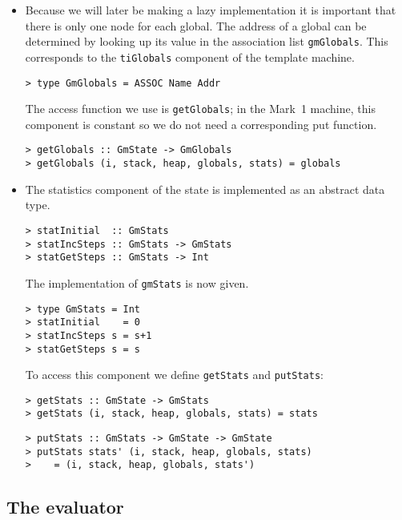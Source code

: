 \begin{itemize}
\item Because we will later be making a lazy implementation it is
important that there is only one node for each global. The address of
a global can be determined by looking up its value in the association
list \mbox{\tt gmGlobals}. This corresponds to the \mbox{\tt tiGlobals} component
of the template machine.
\begin{verbatim}
> type GmGlobals = ASSOC Name Addr
\end{verbatim}
%
The access function we use is \mbox{\tt getGlobals}; in the Mark~1 machine, this
component is constant so we do not need a corresponding put function.
\begin{verbatim}
> getGlobals :: GmState -> GmGlobals
> getGlobals (i, stack, heap, globals, stats) = globals
\end{verbatim}
%
%
\item The statistics component of the state is implemented as an
abstract data type.
\begin{verbatim}
> statInitial  :: GmStats
> statIncSteps :: GmStats -> GmStats
> statGetSteps :: GmStats -> Int
\end{verbatim}
%
%
%
The implementation of \mbox{\tt gmStats} is now given.
\begin{verbatim}
> type GmStats = Int
> statInitial    = 0
> statIncSteps s = s+1
> statGetSteps s = s
\end{verbatim}
%
%
%
%
To access this component we define \mbox{\tt getStats} and \mbox{\tt putStats}:
\begin{verbatim}
> getStats :: GmState -> GmStats
> getStats (i, stack, heap, globals, stats) = stats
\end{verbatim}
%
%
\begin{verbatim}
> putStats :: GmStats -> GmState -> GmState
> putStats stats' (i, stack, heap, globals, stats)
>    = (i, stack, heap, globals, stats')
\end{verbatim}
%
%
\end{itemize}

\subsection{The evaluator}
\label{gm:ss:eval1}

